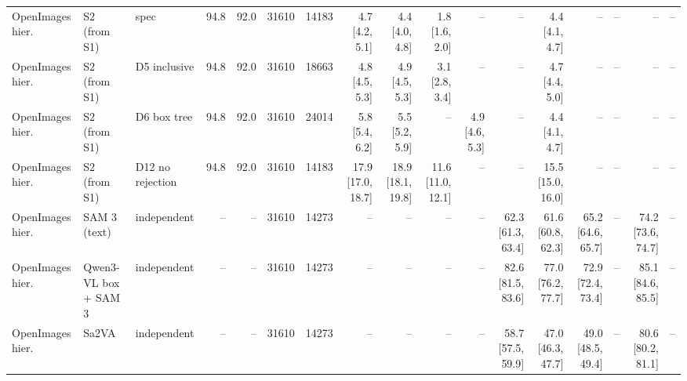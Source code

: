 \begin{tabular}{lllrrrrrrrrrrrrrl}
OpenImages hier. & S2 (from S1) & spec & 94.8 & 92.0 & 31610 & 14183 & 4.7 \scriptsize{[4.2, 5.1]} & 4.4 \scriptsize{[4.0, 4.8]} & 1.8 \scriptsize{[1.6, 2.0]} & -- & -- & 4.4 \scriptsize{[4.1, 4.7]} & -- & -- & -- & -- \\
OpenImages hier. & S2 (from S1) & D5 inclusive & 94.8 & 92.0 & 31610 & 18663 & 4.8 \scriptsize{[4.5, 5.3]} & 4.9 \scriptsize{[4.5, 5.3]} & 3.1 \scriptsize{[2.8, 3.4]} & -- & -- & 4.7 \scriptsize{[4.4, 5.0]} & -- & -- & -- & -- \\
OpenImages hier. & S2 (from S1) & D6 box tree & 94.8 & 92.0 & 31610 & 24014 & 5.8 \scriptsize{[5.4, 6.2]} & 5.5 \scriptsize{[5.2, 5.9]} & -- & 4.9 \scriptsize{[4.6, 5.3]} & -- & 4.4 \scriptsize{[4.1, 4.7]} & -- & -- & -- & -- \\
OpenImages hier. & S2 (from S1) & D12 no rejection & 94.8 & 92.0 & 31610 & 14183 & 17.9 \scriptsize{[17.0, 18.7]} & 18.9 \scriptsize{[18.1, 19.8]} & 11.6 \scriptsize{[11.0, 12.1]} & -- & -- & 15.5 \scriptsize{[15.0, 16.0]} & -- & -- & -- & -- \\
\midrule
OpenImages hier. & SAM 3 (text) & independent & -- & -- & 31610 & 14273 & -- & -- & -- & -- & 62.3 \scriptsize{[61.3, 63.4]} & 61.6 \scriptsize{[60.8, 62.3]} & 65.2 \scriptsize{[64.6, 65.7]} & -- & 74.2 \scriptsize{[73.6, 74.7]} & -- \\
OpenImages hier. & Qwen3-VL box + SAM 3 & independent & -- & -- & 31610 & 14273 & -- & -- & -- & -- & 82.6 \scriptsize{[81.5, 83.6]} & 77.0 \scriptsize{[76.2, 77.7]} & 72.9 \scriptsize{[72.4, 73.4]} & -- & 85.1 \scriptsize{[84.6, 85.5]} & -- \\
OpenImages hier. & Sa2VA & independent & -- & -- & 31610 & 14273 & -- & -- & -- & -- & 58.7 \scriptsize{[57.5, 59.9]} & 47.0 \scriptsize{[46.3, 47.7]} & 49.0 \scriptsize{[48.5, 49.4]} & -- & 80.6 \scriptsize{[80.2, 81.1]} & -- \\
\bottomrule
\end{tabular}
